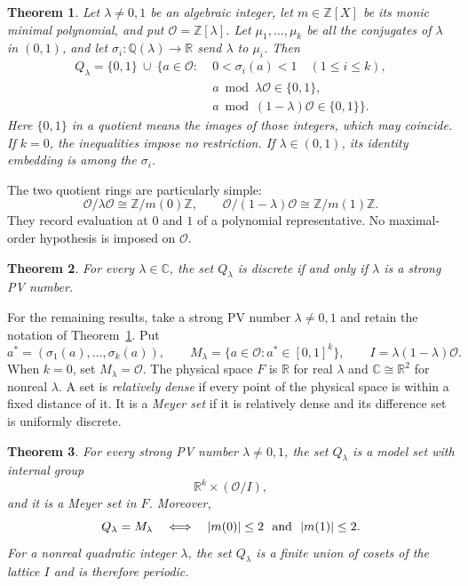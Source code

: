 \documentclass[11pt]{article}
\newtheorem{theorem}{Theorem}
\theoremstyle{remark}
\newcommand{\Z}{\mathbb Z}
\newcommand{\Q}{\mathbb Q}
\newcommand{\R}{\mathbb R}
\newcommand{\C}{\mathbb C}
\newcommand{\Oa}{\mathcal O}
\begin{document}
\begin{theorem}\label{thm:arithmetic}
Let $\lambda\ne0,1$ be an algebraic integer, let $m\in\Z[X]$ be its monic minimal polynomial, and put $\Oa=\Z[\lambda]$. Let $\mu_1,\ldots,\mu_k$ be all the conjugates of $\lambda$ in $(0,1)$, and let $\sigma_i:\Q(\lambda)\to\R$ send $\lambda$ to $\mu_i$. Then
\begin{equation}\label{eq:criterion}
\begin{split}
 Q_\lambda=\{0,1\}\ \cup\ \{a\in\Oa:\;&0<\sigma_i(a)<1\quad(1\le i\le k),\\
 &a\bmod\lambda\Oa\in\{0,1\},\\
 &a\bmod(1-\lambda)\Oa\in\{0,1\}\}.
\end{split}
\end{equation}
Here $\{0,1\}$ in a quotient means the images of those integers, which may coincide. If $k=0$, the inequalities impose no restriction. If $\lambda\in(0,1)$, its identity embedding is among the $\sigma_i$.
\end{theorem}

The two quotient rings are particularly simple:
\begin{equation}\label{eq:endpoints}
 \Oa/\lambda\Oa\cong\Z/m(0)\Z,\qquad
 \Oa/(1-\lambda)\Oa\cong\Z/m(1)\Z.
\end{equation}
They record evaluation at $0$ and $1$ of a polynomial representative. No maximal-order hypothesis is imposed on $\Oa$.

\begin{theorem}\label{thm:discrete}
For every $\lambda\in\C$, the set $Q_\lambda$ is discrete if and only if $\lambda$ is a strong PV number.
\end{theorem}

For the remaining results, take a strong PV number $\lambda\ne0,1$ and retain the notation of Theorem~\ref{thm:arithmetic}. Put
\[
 a^*=(\sigma_1(a),\ldots,\sigma_k(a)),\qquad
 M_\lambda=\{a\in\Oa:a^*\in[0,1]^k\},\qquad
 I=\lambda(1-\lambda)\Oa.
\]
When $k=0$, set $M_\lambda=\Oa$. The physical space $F$ is $\R$ for real $\lambda$ and $\C\cong\R^2$ for nonreal $\lambda$. A set is \emph{relatively dense} if every point of the physical space is within a fixed distance of it. It is a \emph{Meyer set} if it is relatively dense and its difference set is uniformly discrete.

\begin{theorem}\label{thm:model}
For every strong PV number $\lambda\ne0,1$, the set $Q_\lambda$ is a model set with internal group
\[
 \R^k\times(\Oa/I),
\]
and it is a Meyer set in $F$. Moreover,
\begin{equation}\label{eq:equality}
 Q_\lambda=M_\lambda
 \quad\Longleftrightarrow\quad
 |m(0)|\le2\ \hbox{ and }\ |m(1)|\le2.
\end{equation}
For a nonreal quadratic integer $\lambda$, the set $Q_\lambda$ is a finite union of cosets of the lattice $I$ and is therefore periodic.
\end{theorem}
\end{document}
